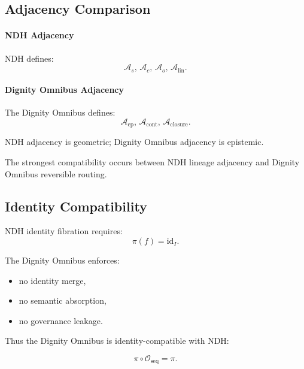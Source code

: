 
\subsection{Adjacency Comparison}

\paragraph{NDH Adjacency}
NDH defines:
\[
\mathcal{A}_s,\,
\mathcal{A}_c,\,
\mathcal{A}_o,\,
\mathcal{A}_{\mathrm{lin}}.
\]

\paragraph{Dignity Omnibus Adjacency}
The Dignity Omnibus defines:
\[
\mathcal{A}_{\mathrm{ep}},\,
\mathcal{A}_{\mathrm{cont}},\,
\mathcal{A}_{\mathrm{closure}}.
\]

NDH adjacency is geometric; Dignity Omnibus adjacency is epistemic.

The strongest compatibility occurs between NDH lineage adjacency and Dignity
Omnibus reversible routing.


\subsection{Identity Compatibility}

NDH identity fibration requires:
\[
\pi(f) = \mathrm{id}_I.
\]

The Dignity Omnibus enforces:
\begin{itemize}
    \item no identity merge,
    \item no semantic absorption,
    \item no governance leakage.
\end{itemize}

Thus the Dignity Omnibus is identity-compatible with NDH:

\[
\pi \circ \mathcal{O}_{\mathrm{seq}} = \pi.
\]


